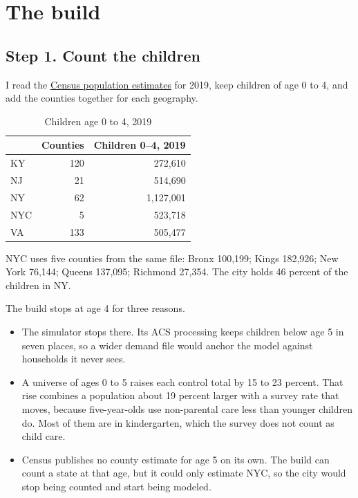 \documentclass[11pt]{article}
\begin{document}
\section{The build}

\subsection*{Step 1. Count the children}

I read the
\href{https://www2.census.gov/programs-surveys/popest/datasets/2010-2019/counties/asrh/cc-est2019-alldata.csv}{Census
population estimates} for 2019, keep children of age 0 to 4, and add the
counties together for each geography.

\begin{table}[H]
\centering
\caption{Children age 0 to 4, 2019}
\begin{tabular}{L{1.6cm}rr}
\toprule
& \textbf{Counties} & \textbf{Children 0--4, 2019} \\
\midrule
KY  & 120 &   272,610 \\
NJ  &  21 &   514,690 \\
NY  &  62 & 1,127,001 \\
NYC &   5 &   523,718 \\
VA  & 133 &   505,477 \\
\bottomrule
\end{tabular}
\end{table}

NYC uses five counties from the same file: Bronx 100,199; Kings 182,926; New
York 76,144; Queens 137,095; Richmond 27,354. The city holds 46 percent of the
children in NY.

The build stops at age 4 for three reasons.

\begin{itemize}
\setlength{\itemsep}{0.45em}
\item The simulator stops there. Its ACS processing keeps children below age 5
      in seven places, so a wider demand file would anchor the model against
      households it never sees.
\item A universe of ages 0 to 5 raises each control total by 15 to 23 percent.
      That rise combines a population about 19 percent larger with a survey rate
      that moves, because five-year-olds use non-parental care less than younger
      children do. Most of them are in kindergarten, which the survey does not
      count as child care.
\item Census publishes no county estimate for age 5 on its own. The build can
      count a state at that age, but it could only estimate NYC, so the city
      would stop being counted and start being modeled.
\end{itemize}
\end{document}
